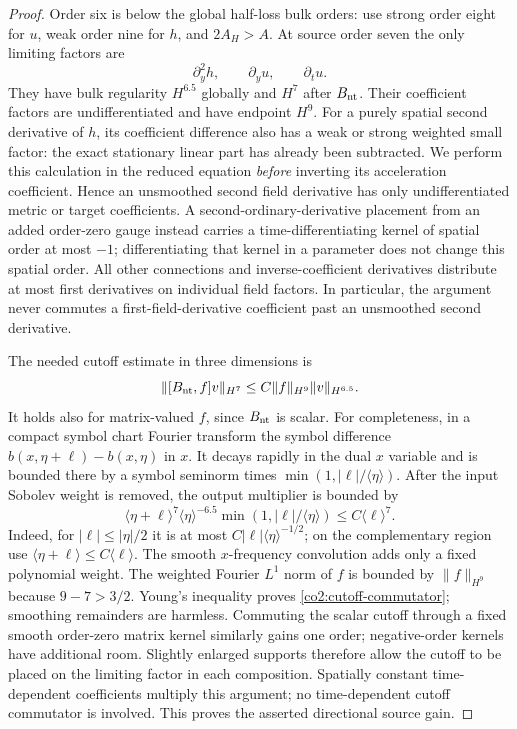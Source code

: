 \begin{proof}
Order six is below the global half-loss bulk orders: use strong order eight
for $u$, weak order nine for $h$, and $2A_H>A$.  At source order seven the
only limiting factors are
\[
 \partial_y^2 h,\qquad\partial_yu,\qquad\partial_tu.
\]
They have bulk regularity $H^{6.5}$ globally and $H^7$ after $B_{\rm nt}$.
Their coefficient factors are undifferentiated and have endpoint $H^9$.
For a purely spatial second derivative of $h$, its coefficient difference
also has a weak or strong weighted small factor: the exact stationary linear
part has already been subtracted.  We perform this calculation in the reduced
equation \emph{before} inverting its acceleration coefficient.  Hence an
unsmoothed second field derivative has only undifferentiated metric or target
coefficients.  A second-ordinary-derivative placement from an added order-zero
gauge instead carries a time-differentiating kernel of spatial order at most
$-1$; differentiating that kernel in a parameter does not change this spatial
order.  All other connections and inverse-coefficient derivatives distribute
at most first derivatives on individual field factors.  In particular, the
argument never commutes a first-field-derivative coefficient past an unsmoothed
second derivative.

The needed cutoff estimate in three dimensions is
\begin{equation}\label{co2:cutoff-commutator}
 \|[B_{\rm nt},f]v\|_{H^7}
       \le C\|f\|_{H^9}\|v\|_{H^{6.5}}.
\end{equation}
It holds also for matrix-valued $f$, since $B_{\rm nt}$ is scalar.
For completeness, in a compact symbol chart Fourier transform the symbol
difference $b(x,\eta+\ell)-b(x,\eta)$ in $x$.  It decays rapidly in the
dual $x$ variable and is bounded there by a symbol seminorm times
$\min(1,|\ell|/\langle\eta\rangle)$.  After the input Sobolev weight is
removed, the output multiplier is bounded by
\[
 \langle\eta+\ell\rangle^7\langle\eta\rangle^{-6.5}
       \min(1,|\ell|/\langle\eta\rangle)
       \le C\langle\ell\rangle^7.
\]
Indeed, for $|\ell|\le|\eta|/2$ it is at most
$C|\ell|\langle\eta\rangle^{-1/2}$; on the complementary region use
$\langle\eta+\ell\rangle\le C\langle\ell\rangle$.
The smooth $x$-frequency convolution adds only a fixed polynomial weight.
The weighted Fourier
$L^1$ norm of $f$ is bounded by $\|f\|_{H^9}$ because
$9-7>3/2$.  Young's inequality proves \eqref{co2:cutoff-commutator}; smoothing
remainders are harmless.  Commuting the scalar cutoff through a fixed smooth
order-zero matrix kernel similarly gains one order; negative-order kernels
have additional room.  Slightly enlarged supports therefore allow the cutoff
to be placed on the limiting factor in each composition.  Spatially constant
time-dependent coefficients multiply this argument; no time-dependent cutoff
commutator is involved.  This proves the asserted directional source gain.


\end{proof}
